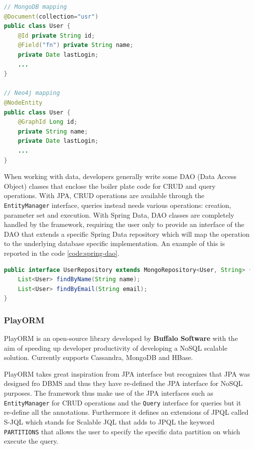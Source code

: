\begin{lstlisting}[language=Java, caption=Spring Data object mapping, label=code:spring-object-mapping]
// MongoDB mapping
@Document(collection="usr")
public class User {
    @Id private String id;
    @Field("fn") private String name;
    private Date lastLogin;
    ...
}

// Neo4j mapping
@NodeEntity
public class User {
    @GraphId Long id;
    private String name;
    private Date lastLogin;
    ...
}
\end{lstlisting}

\noindent When working with data, developers generally write some DAO (Data Access Object) classes that enclose the boiler plate code for CRUD and query operations.
With JPA, CRUD operations are available through the \texttt{EntityManager} interface, queries instead needs various operations: creation, parameter set and execution.
With Spring Data, DAO classes are completely handled by the framework, requiring the user only to provide an interface of the DAO that extends a specific Spring Data repository which will map the operation to the underlying database specific implementation.
An example of this is reported in the code \ref{code:spring-dao}.

\begin{lstlisting}[language=Java, caption=Spring Data repositories, label=code:spring-dao]
public interface UserRepository extends MongoRepository<User, String> {
    List<User> findByName(String name);
    List<User> findByEmail(String email);
}
\end{lstlisting}

\subsubsection{PlayORM}
PlayORM \cite{online:playorm} is an open-source library developed by \textbf{Buffalo Software} with the aim of speeding up developer productivity of developing a NoSQL scalable solution. Currently supports Cassandra, MongoDB and HBase. 

\newparagraph PlayORM takes great inspiration from JPA interface but recognizes that JPA was designed fro DBMS and thus they have re-defined the JPA interface  for NoSQL purposes.
The framework thus make use of the JPA interfaces such as \texttt{EntityManager} for CRUD operations and the \texttt{Query} interface for queries but it re-define all the annotations.
Furthermore it defines an extensions of JPQL called S-JQL which stands for Scalable JQL that adds to JPQL the keyword \texttt{PARTITIONS} that allows the user to specify the specific data partition on which execute the query.

